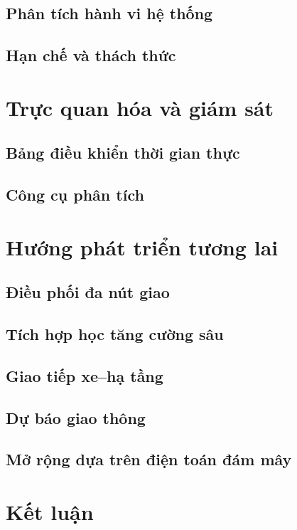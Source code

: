 \documentclass[12pt,a4paper,oneside]{report}
\begin{document}
\section{Phân tích hành vi hệ thống}
\section{Hạn chế và thách thức}

\chapter{Trực quan hóa và giám sát}
\section{Bảng điều khiển thời gian thực}
\section{Công cụ phân tích}

\chapter{Hướng phát triển tương lai}
\section{Điều phối đa nút giao}
\section{Tích hợp học tăng cường sâu}
\section{Giao tiếp xe--hạ tầng}
\section{Dự báo giao thông}
\section{Mở rộng dựa trên điện toán đám mây}

\chapter{Kết luận}
\end{document}
